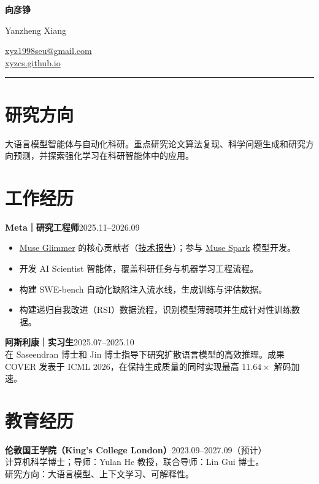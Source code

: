 \documentclass[UTF8,11pt,a4paper,fontset=none]{ctexart}
\begin{document}
\noindent
\begin{minipage}[t]{0.54\textwidth}
  {\fontsize{25}{29}\selectfont\sffamily\bfseries 向彦铮}\par
  \vspace{0.17em}
  {\small\color{muted}Yanzheng Xiang}
\end{minipage}\hfill
\begin{minipage}[t]{0.43\textwidth}
  \raggedleft\small
  \href{mailto:xyz1998seu@gmail.com}{xyz1998seu@gmail.com}\\
  \href{https://xyzcs.github.io/}{xyzcs.github.io}
\end{minipage}
\par\vspace{0.72em}
{\color{rulegray}\rule{\textwidth}{0.65pt}}

\section*{研究方向}
大语言模型智能体与自动化科研。重点研究论文算法复现、科学问题生成和研究方向预测，并探索强化学习在科研智能体中的应用。

\section*{工作经历}
\textbf{Meta｜研究工程师}\hfill 2025.11--2026.09
\begin{itemize}
  \item \href{https://research.meta.ai/blog/introducing-muse-glimmer-open-agentic-model}{Muse Glimmer} 的核心贡献者（\href{https://xyzcs.github.io/files/muse-glimmer-technical-report.pdf}{技术报告}）；参与 \href{https://ai.meta.com/blog/introducing-muse-spark-msl/}{Muse Spark} 模型开发。
  \item 开发 AI Scientist 智能体，覆盖科研任务与机器学习工程流程。
  \item 构建 SWE-bench 自动化缺陷注入流水线，生成训练与评估数据。
  \item 构建递归自我改进（RSI）数据流程，识别模型薄弱项并生成针对性训练数据。
\end{itemize}

\textbf{阿斯利康｜实习生}\hfill 2025.07--2025.10\\
在 Saseendran 博士和 Jin 博士指导下研究扩散语言模型的高效推理。成果 COVER 发表于 ICML 2026，在保持生成质量的同时实现最高 $11.64\times$ 解码加速。

\section*{教育经历}
\textbf{伦敦国王学院（King's College London）}\hfill 2023.09--2027.09（预计）\\
计算机科学博士；导师：Yulan He 教授，联合导师：Lin Gui 博士。\\
研究方向：大语言模型、上下文学习、可解释性。
\end{document}
